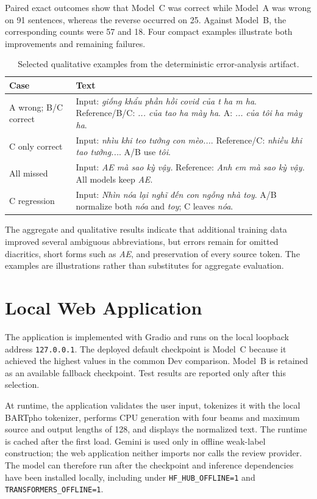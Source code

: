 \documentclass[11pt]{article}
\begin{document}
Paired exact outcomes show that Model~C was correct while Model~A was wrong on 91 sentences, whereas the reverse occurred on 25. Against Model~B, the corresponding counts were 57 and 18. Four compact examples illustrate both improvements and remaining failures.

\begin{table}[t]
\centering
\caption{Selected qualitative examples from the deterministic error-analysis artifact.}
\label{tab:error-examples}
\small
\begin{tabularx}{\textwidth}{lX}
\toprule
Case & Text \\
\midrule
A wrong; B/C correct & Input: \textit{giống khẩu phần hồi covid của t ha m ha}. Reference/B/C: \textit{... của tao ha mày ha}. A: \textit{... của tôi ha mày ha}. \\
C only correct & Input: \textit{nhìu khi teo tưởng con mèo...}. Reference/C: \textit{nhiều khi tao tưởng...}. A/B use \textit{tôi}. \\
All missed & Input: \textit{AE mà sao kỳ vậy.} Reference: \textit{Anh em mà sao kỳ vậy.} All models keep \textit{AE}. \\
C regression & Input: \textit{Nhìn nóa lại nghĩ đến con ngỗng nhà toy}. A/B normalize both \textit{nóa} and \textit{toy}; C leaves \textit{nóa}. \\
\bottomrule
\end{tabularx}
\end{table}

The aggregate and qualitative results indicate that additional training data improved several ambiguous abbreviations, but errors remain for omitted diacritics, short forms such as \textit{AE}, and preservation of every source token. The examples are illustrations rather than substitutes for aggregate evaluation.

\section{Local Web Application}

The application is implemented with Gradio and runs on the local loopback address \texttt{127.0.0.1}. The deployed default checkpoint is Model~C because it achieved the highest values in the common Dev comparison. Model~B is retained as an available fallback checkpoint. Test results are reported only after this selection.

At runtime, the application validates the user input, tokenizes it with the local BARTpho tokenizer, performs CPU generation with four beams and maximum source and output lengths of 128, and displays the normalized text. The runtime is cached after the first load. Gemini is used only in offline weak-label construction; the web application neither imports nor calls the review provider. The model can therefore run after the checkpoint and inference dependencies have been installed locally, including under \texttt{HF\_HUB\_OFFLINE=1} and \texttt{TRANSFORMERS\_OFFLINE=1}.
\end{document}
